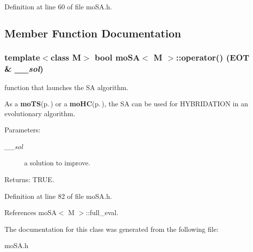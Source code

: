 Definition at line 60 of file mo\-SA.h.

\subsection{Member Function Documentation}
\subsubsection{\setlength{\rightskip}{0pt plus 5cm}template$<$class M$>$ bool {\bf mo\-SA}$<$ M $>$::operator() ({\bf EOT} \& {\em \_\-\_\-sol})\hspace{0.3cm}{\tt  [inline]}}\label{classmo_s_a_0e4c54b57bc13fcbd4763883b8f719e5}


function that launches the SA algorithm. 

As a {\bf mo\-TS}{\rm (p.\,\pageref{classmo_t_s})} or a {\bf mo\-HC}{\rm (p.\,\pageref{classmo_h_c})}, the SA can be used for HYBRIDATION in an evolutionary algorithm.

\begin{Desc}
\item[Parameters:]
\begin{description}
\item[{\em \_\-\_\-sol}]a solution to improve. \end{description}
\end{Desc}
\begin{Desc}
\item[Returns:]TRUE. \end{Desc}


Definition at line 82 of file mo\-SA.h.

References mo\-SA$<$ M $>$::full\_\-eval.

The documentation for this class was generated from the following file:\begin{CompactItemize}
\item 
mo\-SA.h\end{CompactItemize}
